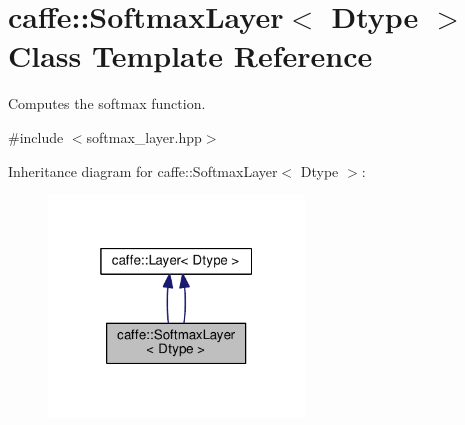 \hypertarget{classcaffe_1_1_softmax_layer}{}\section{caffe\+:\+:Softmax\+Layer$<$ Dtype $>$ Class Template Reference}
\label{classcaffe_1_1_softmax_layer}


Computes the softmax function.  




{\ttfamily \#include $<$softmax\+\_\+layer.\+hpp$>$}



Inheritance diagram for caffe\+:\+:Softmax\+Layer$<$ Dtype $>$\+:
\nopagebreak
\begin{figure}[H]
\begin{center}
\leavevmode
\includegraphics[width=193pt]{classcaffe_1_1_softmax_layer__inherit__graph}
\end{center}
\end{figure}

